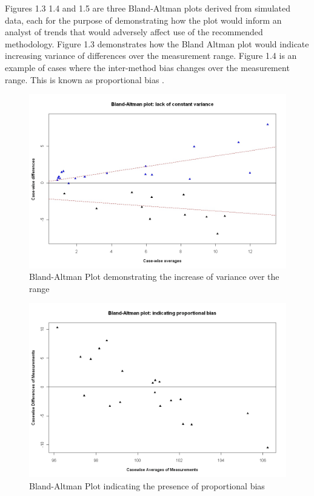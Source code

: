 \documentclass[Chap1main.tex]{subfiles}
\begin{document}
Figures 1.3 1.4 and 1.5 are three Bland-Altman plots derived from
simulated data, each for the purpose of demonstrating how the plot
would inform an analyst of trends that would adversely affect use
of the recommended methodology. Figure 1.3 demonstrates how the
Bland Altman plot would indicate increasing variance of
differences over the measurement range. Figure 1.4 is an example
of cases where the inter-method bias changes over the measurement
range. This is known as proportional bias \citep{ludbrook97}.


\begin{figure}[h!]
\begin{center}
  \includegraphics[width=125mm]{BAFanEffect.jpeg}
  \caption{Bland-Altman Plot demonstrating the increase of variance over the range}\label{BAFanEffect}
\end{center}
\end{figure}

\begin{figure}[h!]
\begin{center}
  \includegraphics[width=125mm]{PropBias.jpeg}
  \caption{Bland-Altman Plot indicating the presence of proportional bias}\label{PropBias}
\end{center}
\end{figure}
\end{document}
